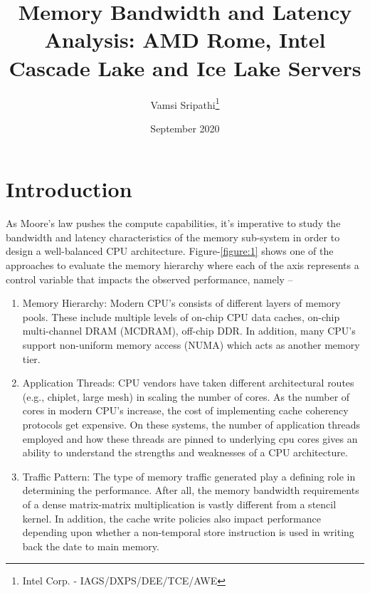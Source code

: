 \documentclass{article}
\begin{document}
\title{Memory Bandwidth and Latency Analysis: AMD Rome, Intel Cascade Lake and Ice Lake Servers}
\author{Vamsi Sripathi\thanks{Intel Corp. - IAGS/DXPS/DEE/TCE/AWE}}
\date{September 2020}
\maketitle

\tableofcontents
\listoffigures
\listoftables
\newpage

\section{Introduction}
As Moore's law pushes the compute capabilities, it's imperative to study the bandwidth and latency characteristics of the memory sub-system in order to design a well-balanced CPU architecture. Figure-\ref{figure:1} shows one of the approaches to evaluate the memory hierarchy where each of the axis represents a control variable that impacts the observed performance, namely --
\begin{enumerate}
    \item Memory Hierarchy: Modern CPU's consists of different layers of memory pools. These include multiple levels of on-chip CPU data caches, on-chip multi-channel DRAM (MCDRAM), off-chip DDR. In addition, many CPU's support non-uniform memory access (NUMA) which acts as another memory tier.
    \item Application Threads: CPU vendors have taken different architectural routes (e.g., chiplet, large mesh) in scaling the number of cores. As the number of cores in modern CPU's increase, the cost of implementing cache coherency protocols get expensive. On these systems, the number of application threads employed and how these threads are pinned to underlying cpu cores gives an ability to understand the strengths and weaknesses of a CPU architecture.
    \item Traffic Pattern: The type of memory traffic generated play a defining role in determining the performance. After all, the memory bandwidth requirements of a dense matrix-matrix multiplication is vastly different from a stencil kernel. In addition, the cache write policies also impact performance depending upon whether a non-temporal store instruction is used in writing back the date to main memory.
\end{enumerate}
\end{document}
